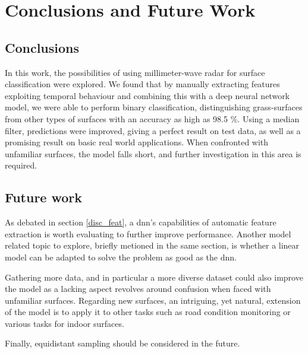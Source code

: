 \chapter{Conclusions and Future Work}

\section{Conclusions}
In this work, the possibilities of using millimeter-wave radar for surface classification were explored. We found that by manually extracting features exploiting temporal behaviour and combining this with a deep neural network model, we were able to perform binary classification, distinguishing grass-surfaces from other types of surfaces with an accuracy as high as 98.5 \%. Using a median filter, predictions were improved, giving a perfect result on test data, as well as a promising result on basic real world applications. When confronted with unfamiliar surfaces, the model falls short, and further investigation in this area is required. 


\section{Future work}
As debated in section \ref{disc_feat}, a \gls{dnn}'s capabilities of automatic feature extraction is worth evaluating to further improve performance. Another model related topic to explore, briefly metioned in the same section, is whether a linear model can be adapted to solve the problem as good as the \gls{dnn}.

Gathering more data, and in particular a more diverse dataset could also improve the model as a lacking aspect revolves around confusion when faced with unfamiliar surfaces. Regarding new surfaces, an intriguing, yet natural, extension of the model is to apply it to other tasks such as road condition monitoring or various tasks for indoor surfaces.

Finally, equidistant sampling should be considered in the future.
